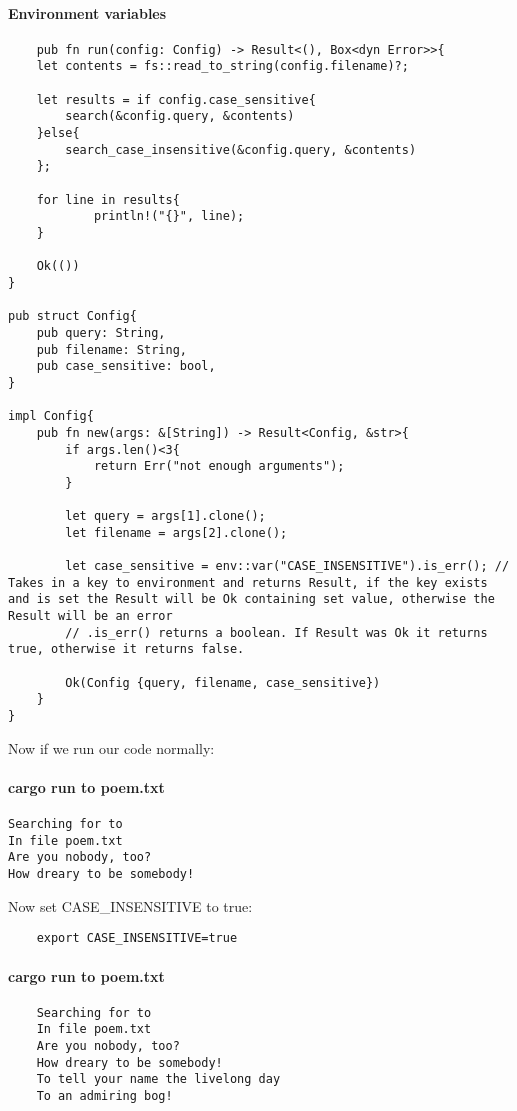 \paragraph*{Environment variables}\begin{lstlisting}
    pub fn run(config: Config) -> Result<(), Box<dyn Error>>{
    let contents = fs::read_to_string(config.filename)?; 
    
    let results = if config.case_sensitive{
        search(&config.query, &contents)
    }else{
        search_case_insensitive(&config.query, &contents)
    };

    for line in results{
            println!("{}", line);
    }

    Ok(())
}

pub struct Config{
    pub query: String,
    pub filename: String,
    pub case_sensitive: bool,
}

impl Config{
    pub fn new(args: &[String]) -> Result<Config, &str>{
        if args.len()<3{
            return Err("not enough arguments");
        }

        let query = args[1].clone();
        let filename = args[2].clone();
        
        let case_sensitive = env::var("CASE_INSENSITIVE").is_err(); // Takes in a key to environment and returns Result, if the key exists and is set the Result will be Ok containing set value, otherwise the Result will be an error
        // .is_err() returns a boolean. If Result was Ok it returns true, otherwise it returns false.
        
        Ok(Config {query, filename, case_sensitive})
    } 
}
\end{lstlisting}

Now if we run our code normally:

\paragraph*{cargo run to poem.txt}\begin{lstlisting}
Searching for to
In file poem.txt
Are you nobody, too?
How dreary to be somebody!
\end{lstlisting}

Now set CASE\_INSENSITIVE to true:\begin{lstlisting}
    export CASE_INSENSITIVE=true
\end{lstlisting}
\paragraph*{cargo run to poem.txt}\begin{lstlisting}
    Searching for to
    In file poem.txt
    Are you nobody, too?
    How dreary to be somebody!
    To tell your name the livelong day
    To an admiring bog!
\end{lstlisting}
